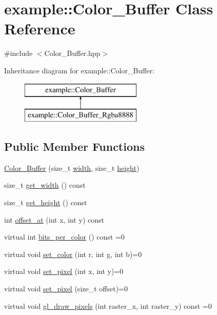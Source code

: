 \hypertarget{classexample_1_1_color___buffer}{}\section{example\+:\+:Color\+\_\+\+Buffer Class Reference}
\label{classexample_1_1_color___buffer}


{\ttfamily \#include $<$Color\+\_\+\+Buffer.\+hpp$>$}

Inheritance diagram for example\+:\+:Color\+\_\+\+Buffer\+:\begin{figure}[H]
\begin{center}
\leavevmode
\includegraphics[height=2.000000cm]{classexample_1_1_color___buffer}
\end{center}
\end{figure}
\subsection*{Public Member Functions}
\begin{DoxyCompactItemize}
\item 
\mbox{\hyperlink{classexample_1_1_color___buffer_a44c19770a14b0f8e46e7ceda1df5fc3d}{Color\+\_\+\+Buffer}} (size\+\_\+t \mbox{\hyperlink{classexample_1_1_color___buffer_ab61454d4b35cbba00d2e634d14ed20ac}{width}}, size\+\_\+t \mbox{\hyperlink{classexample_1_1_color___buffer_ae01f4538ee30af1d3072a425c5ad37ac}{height}})
\item 
size\+\_\+t \mbox{\hyperlink{classexample_1_1_color___buffer_a0bbc4a120bc04b512e303baf8330ff82}{get\+\_\+width}} () const
\item 
size\+\_\+t \mbox{\hyperlink{classexample_1_1_color___buffer_a4d1495a260205b83e1bd28dd04c6eda2}{get\+\_\+height}} () const
\item 
int \mbox{\hyperlink{classexample_1_1_color___buffer_ae316a2df43a9ead02cc45170a8d0f7ed}{offset\+\_\+at}} (int x, int y) const
\item 
virtual int \mbox{\hyperlink{classexample_1_1_color___buffer_a76463553dc782f2dc24a61bec708e273}{bits\+\_\+per\+\_\+color}} () const =0
\item 
virtual void \mbox{\hyperlink{classexample_1_1_color___buffer_a3fbfa949ee340ccdb40ad0ce8339b827}{set\+\_\+color}} (int r, int g, int b)=0
\item 
virtual void \mbox{\hyperlink{classexample_1_1_color___buffer_a967ea326ec0889a36db523727a8154b5}{set\+\_\+pixel}} (int x, int y)=0
\item 
virtual void \mbox{\hyperlink{classexample_1_1_color___buffer_a1c919e629ef74e418e1ad416d0a5e85a}{set\+\_\+pixel}} (size\+\_\+t offset)=0
\item 
virtual void \mbox{\hyperlink{classexample_1_1_color___buffer_a793b667028b2eb7efde2cee76066eac7}{gl\+\_\+draw\+\_\+pixels}} (int raster\+\_\+x, int raster\+\_\+y) const =0
\end{DoxyCompactItemize}
